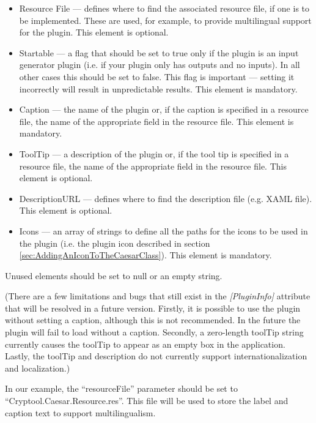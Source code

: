 \begin{itemize}
	\item Resource File --- defines where to find the associated resource file, if one is to be implemented. These are used, for example, to provide multilingual support for the plugin. This element is optional.
	\item Startable --- a flag that should be set to true only if the plugin is an input generator plugin (i.e. if your plugin only has outputs and no inputs). In all other cases this should be set to false. This flag is important --- setting it incorrectly will result in unpredictable results. This element is mandatory.
	\item Caption --- the name of the plugin or, if the caption is specified in a resource file, the name of the appropriate field in the resource file. This element is mandatory.
	\item ToolTip --- a description of the plugin or, if the tool tip is specified in a resource file, the name of the appropriate field in the resource file. This element is optional.
	\item DescriptionURL --- defines where to find the description file (e.g. XAML file). This element is optional.
	\item Icons --- an array of strings to define all the paths for the icons to be used in the plugin (i.e. the plugin icon described in section \ref{sec:AddingAnIconToTheCaesarClass}). This element is mandatory.
\end{itemize}

\noindent Unused elements should be set to null or an empty string.

(There are a few limitations and bugs that still exist in the \textit{[PluginInfo]} attribute that will be resolved in a future version. Firstly, it is possible to use the plugin without setting a caption, although this is not recommended. In the future the plugin will fail to load without a caption. Secondly, a zero-length toolTip string currently causes the toolTip to appear as an empty box in the application. Lastly, the toolTip and description do not currently support internationalization and localization.)

In our example, the ``resourceFile'' parameter should be set to ``Cryptool.Caesar.Resource.res''. This file will be used to store the label and caption text to support multilingualism.


